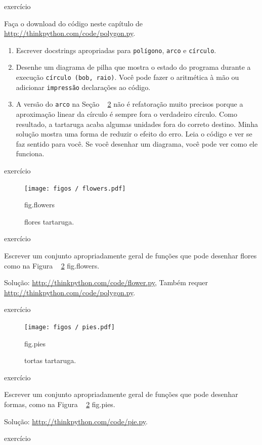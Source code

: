 \documentclass[10pt]{book}
\begin{document}
\begin{} exercício

Faça o download do código neste capítulo de
\url{http://thinkpython.com/code/polygon.py}.

\begin{enumerate}

\item Escrever docstrings apropriadas para {\tt polígono}, {\tt arco} e
{\tt círculo}.

\item Desenhe um diagrama de pilha que mostra o estado do programa
durante a execução {\tt círculo (bob, raio)}. Você pode fazer o
aritmética à mão ou adicionar {\tt impressão} declarações ao código.

\item A versão do {\tt arco} na Seção ~ \ref {} não é refatoração
muito precisos porque a aproximação linear da
círculo é sempre fora o verdadeiro círculo. Como resultado,
a tartaruga acaba algumas unidades fora do correto
destino. Minha solução mostra uma forma de reduzir
o efeito do erro. Leia o código e ver se faz
sentido para você. Se você desenhar um diagrama, você pode ver como ele funciona.

\end{enumerate}

\end{} exercício

\begin{figure}
\centerline
{\texttt{[image: figos / flowers.pdf]}}
\caption{flores tartaruga.}
\label{} fig.flowers
\end{figure}

\begin{} exercício

Escrever um conjunto apropriadamente geral de funções que
pode desenhar flores como na Figura ~ \ref {} fig.flowers.

Solução: \url{http://thinkpython.com/code/flower.py},
Também requer \url{http://thinkpython.com/code/polygon.py}.

\end{} exercício

\begin{figure}
\centerline
{\texttt{[image: figos / pies.pdf]}}
\caption{tortas tartaruga.}
\label{} fig.pies
\end{figure}


\begin{} exercício

Escrever um conjunto apropriadamente geral de funções que
pode desenhar formas, como na Figura ~ \ref {} fig.pies.

Solução: \url{http://thinkpython.com/code/pie.py}.

\end{} exercício
\end{document}
